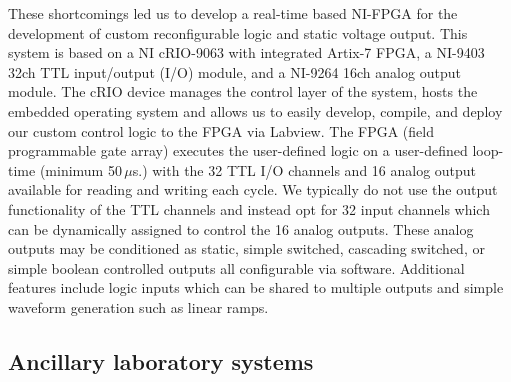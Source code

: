 These shortcomings led us to develop a real-time based NI-FPGA for the development of custom reconfigurable logic and static voltage output.
This system is based on a NI cRIO-9063 with integrated Artix-7 FPGA, a NI-9403 32ch TTL input/output (I/O) module, and a NI-9264 16ch analog output module.
The cRIO device manages the control layer of the system, hosts the embedded operating system and allows us to easily develop, compile, and deploy our custom control logic to the FPGA via Labview.
The FPGA (field programmable gate array) executes the user-defined logic on a user-defined loop-time (minimum 50\,$\mu$s.) with the 32 TTL I/O channels and 16 analog output available for reading and writing each cycle.
We typically do not use the output functionality of the TTL channels and instead opt for 32 input channels which can be dynamically assigned to control the 16 analog outputs.
These analog outputs may be conditioned as static, simple switched, cascading switched, or simple boolean controlled outputs all configurable via software.
Additional features include logic inputs which can be shared to multiple outputs and simple waveform generation such as linear ramps.

\subsection{Ancillary laboratory systems} \label{ssec:misc_sys}
%

